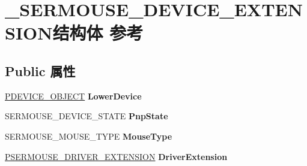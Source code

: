 \hypertarget{struct___s_e_r_m_o_u_s_e___d_e_v_i_c_e___e_x_t_e_n_s_i_o_n}{}\section{\+\_\+\+S\+E\+R\+M\+O\+U\+S\+E\+\_\+\+D\+E\+V\+I\+C\+E\+\_\+\+E\+X\+T\+E\+N\+S\+I\+O\+N结构体 参考}
\label{struct___s_e_r_m_o_u_s_e___d_e_v_i_c_e___e_x_t_e_n_s_i_o_n}
\subsection*{Public 属性}
\begin{DoxyCompactItemize}
\item 
\mbox{\label{struct___s_e_r_m_o_u_s_e___d_e_v_i_c_e___e_x_t_e_n_s_i_o_n_a4cb4eb8ecd42d42617706f5defb84916}} 
\hyperlink{struct___d_e_v_i_c_e___o_b_j_e_c_t}{P\+D\+E\+V\+I\+C\+E\+\_\+\+O\+B\+J\+E\+CT} {\bfseries Lower\+Device}
\item 
\mbox{\label{struct___s_e_r_m_o_u_s_e___d_e_v_i_c_e___e_x_t_e_n_s_i_o_n_aa5bfd80d58d646e2ad915683168bb42c}} 
S\+E\+R\+M\+O\+U\+S\+E\+\_\+\+D\+E\+V\+I\+C\+E\+\_\+\+S\+T\+A\+TE {\bfseries Pnp\+State}
\item 
\mbox{\label{struct___s_e_r_m_o_u_s_e___d_e_v_i_c_e___e_x_t_e_n_s_i_o_n_a4a0d79e2009910baa2706b9a67afd68b}} 
S\+E\+R\+M\+O\+U\+S\+E\+\_\+\+M\+O\+U\+S\+E\+\_\+\+T\+Y\+PE {\bfseries Mouse\+Type}
\item 
\mbox{\label{struct___s_e_r_m_o_u_s_e___d_e_v_i_c_e___e_x_t_e_n_s_i_o_n_a2011cc9cdfd3458f347292d04a362d2d}} 
\hyperlink{struct___s_e_r_m_o_u_s_e___d_r_i_v_e_r___e_x_t_e_n_s_i_o_n}{P\+S\+E\+R\+M\+O\+U\+S\+E\+\_\+\+D\+R\+I\+V\+E\+R\+\_\+\+E\+X\+T\+E\+N\+S\+I\+ON} {\bfseries Driver\+Extension}
\item 
\mbox{\label{struct___s_e_r_m_o_u_s_e___d_e_v_i_c_e___e_x_t_e_n_s_i_o_n_ae2ff70f03efab40389a57e8391f8aeef}} 

\end{DoxyCompactItemize}
